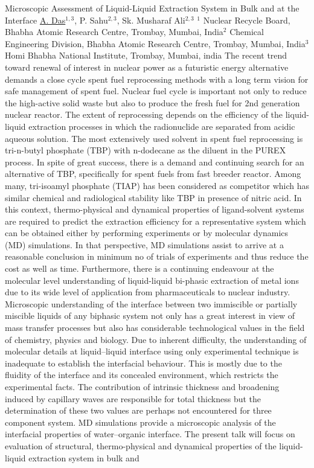 
    \begin{abstract_online}{Microscopic Assessment of Liquid-Liquid Extraction System in Bulk and at the Interface}{%
        \underline{A. Das}$^{1, 3}$, P. Sahu$^{2, 3}$, Sk. Musharaf Ali$^{2, 3}$}{%
        \IStag}{%
        $^1$ Nuclear Recycle Board, Bhabha Atomic Research Centre, Trombay, Mumbai, India\newline{}$^2$ Chemical Engineering Division, Bhabha Atomic Research Centre, Trombay, Mumbai, India\newline{}$^3$ Homi Bhabha National Institute, Trombay, Mumbai, india}
    The recent trend toward renewal of interest in nuclear power as a futuristic energy alternative demands a close cycle spent fuel  reprocessing  methods  with  a  long  term  vision  for  safe management of  spent  fuel.  Nuclear fuel cycle is important not only to reduce the high-active solid waste but also to produce the fresh fuel for 2nd generation nuclear reactor. The extent of reprocessing depends on the efficiency of the liquid-liquid extraction processes in which the radionuclide are separated from acidic aqueous solution. The most extensively used solvent in spent fuel reprocessing is tri-n-butyl phosphate (TBP) with n-dodecane as the diluent in the PUREX process. In spite of great success, there is a demand and continuing search for an alternative of TBP, specifically for spent fuels from fast  breeder reactor. Among many, tri-isoamyl phosphate (TIAP) has been considered as competitor which has similar chemical and radiological stability like TBP in presence of nitric acid. In this context, thermo-physical and dynamical properties of ligand-solvent systems are required to predict the extraction efficiency for a representative system which can be obtained either by performing experiments or by molecular dynamics (MD) simulations. In that perspective, MD simulations assist to arrive at a reasonable conclusion in minimum no of trials of experiments and thus reduce the cost as well as time. Furthermore, there is a continuing endeavour  at the molecular level understanding of liquid-liquid bi-phasic extraction of metal ions due to its wide level of application from pharmaceuticals to nuclear industry. Microscopic understanding of the interface between two immiscible or partially miscible liquids of any biphasic system not only has a great interest in view of mass transfer processes but also has considerable technological values in the field of chemistry, physics and biology. Due to inherent difficulty, the understanding of molecular details at liquid–liquid interface using only experimental technique is inadequate to establish the interfacial behaviour. This is mostly due to the fluidity of the interface and its concealed environment, which restricts the experimental facts. The contribution of intrinsic thickness and broadening induced by capillary waves are responsible for total thickness but the determination of these two values are perhaps not encountered for three component system. MD simulations provide a microscopic analysis of the interfacial properties of water–organic interface. The present talk will focus on evaluation of structural, thermo-physical and dynamical properties of the liquid-liquid extraction system in bulk and 
\end{abstract_online}
